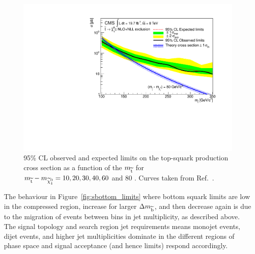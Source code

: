 \begin{figure}[!Hhtb]
\begin{center}
  \includegraphics[scale=0.39]{Figures/sus13009/limits//Limit80.pdf}
  \caption{95\% CL observed and expected limits on the top-squark production cross section as a function of the $m_{\widetilde{{\rm t}}}$ for $m_{\widetilde{{\rm t}}} - m_{\widetilde{\chi}^{0}_{1}} = 10, 20, 30, 40, 60$ and 80 \GeV. Curves taken from Ref.~\cite{sus13009}.}
  \label{fig:stop_limits}
  \end{center}
\end{figure}

The behaviour in Figure~\ref{fig:sbottom_limits} where bottom squark limits are low in the compressed region, increase for larger $\Delta m_{\widetilde{{\rm b}}}$, and then decrease again is due to the migration of events between bins in jet multiplicity, as described above. 
The signal topology and search region jet requirements means monojet events, dijet events, and higher jet multiplicities dominate in the different regions of phase space and signal acceptance (and hence limits) respond accordingly. 


